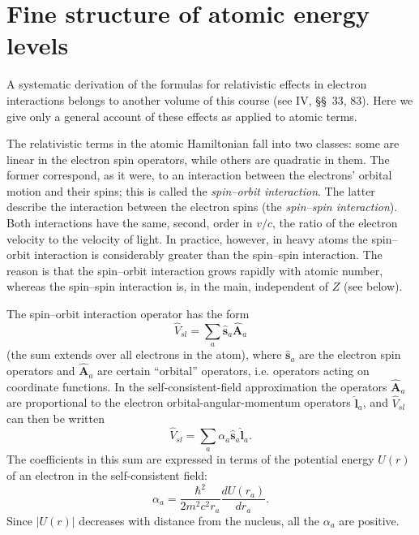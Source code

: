 \section{Fine structure of atomic energy levels}

A systematic derivation of the formulas for relativistic effects in electron interactions belongs to another volume of this course (see IV, \S\S~33, 83). Here we give only a general account of these effects as applied to atomic terms.

The relativistic terms in the atomic Hamiltonian fall into two classes: some are linear in the electron spin operators, while others are quadratic in them. The former correspond, as it were, to an interaction between the electrons' orbital motion and their spins; this is called the \emph{spin--orbit interaction}. The latter describe the interaction between the electron spins (the \emph{spin--spin interaction}). Both interactions have the same, second, order in $v/c$, the ratio of the electron velocity to the velocity of light. In practice, however, in heavy atoms the spin--orbit interaction is considerably greater than the spin--spin interaction. The reason is that the spin--orbit interaction grows rapidly with atomic number, whereas the spin--spin interaction is, in the main, independent of $Z$ (see below).

The spin--orbit interaction operator has the form
\begin{equation}
 \hat V_{sl}=\sum_a\hat{\mathbf s}_a\hat{\mathbf A}_a
 \tag{72.1}
\end{equation}
(the sum extends over all electrons in the atom), where $\hat{\mathbf s}_a$ are the electron spin operators and $\hat{\mathbf A}_a$ are certain ``orbital'' operators, i.e. operators acting on coordinate functions. In the self-consistent-field approximation the operators $\hat{\mathbf A}_a$ are proportional to the electron orbital-angular-momentum operators $\hat{\mathbf l}_a$, and $\hat V_{sl}$ can then be written
\begin{equation}
 \hat V_{sl}=\sum_a\alpha_a\hat{\mathbf s}_a\hat{\mathbf l}_a.
 \tag{72.2}
\end{equation}
The coefficients in this sum are expressed in terms of the potential energy $U(r)$ of an electron in the self-consistent field:
\begin{equation}
 \alpha_a=\frac{\hbar^2}{2m^2c^2r_a}\frac{dU(r_a)}{dr_a}.
 \tag{72.3}
\end{equation}
Since $|U(r)|$ decreases with distance from the nucleus, all the $\alpha_a$ are positive.

